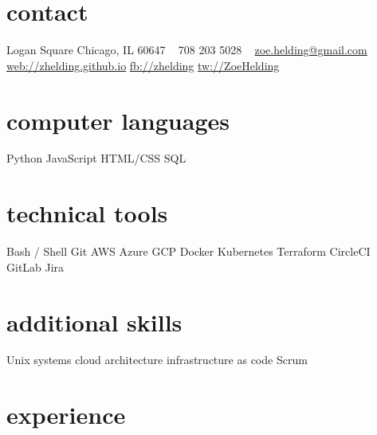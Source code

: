 \documentclass[letterpaper]{friggeri-cv} %
\begin{document}


\begin{aside} %
\section{contact}
Logan Square
Chicago, IL 60647
~
708 203 5028
~
\href{mailto:zoe.helding@gmail.com}{zoe.helding@gmail.com}
\href{https://zhelding.github.io}{web://zhelding.github.io}
\href{http://facebook.com/zhelding}{fb://zhelding}
\href{http://twitter.com/ZoeHelding}{tw://ZoeHelding}
\section{computer languages}
Python
JavaScript
HTML/CSS
SQL
\section{technical tools}
Bash / Shell
Git
AWS
Azure
GCP
Docker
Kubernetes
Terraform
CircleCI
GitLab
Jira
\section{additional skills}
Unix systems
cloud architecture
infrastructure as code
Scrum
\end{aside}


\section{experience}
\end{document}
